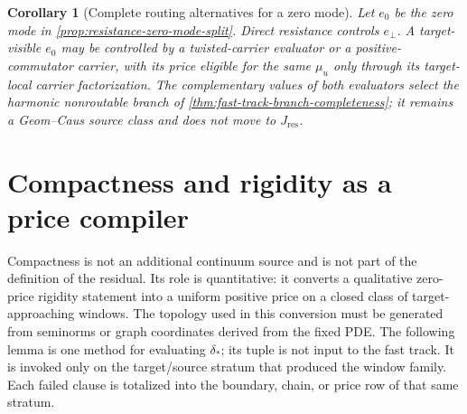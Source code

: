 \documentclass[11pt]{article}
\numberwithin{section}{part}
\theoremstyle{plain}
\newtheorem{corollary}[corollary]{Corollary}
\theoremstyle{definition}
\theoremstyle{remark}
\newcommand{\Res}{J_{\mathrm{res}}}
\begin{document}
\begin{corollary}[Complete routing alternatives for a zero mode]
\label{cor:zero-mode-routing-alternatives}
Let \(e_0\) be the zero mode in
\cref{prop:resistance-zero-mode-split}.  Direct resistance controls
\(e_\perp\).  A target-visible \(e_0\) may be controlled by a
twisted-carrier evaluator or a positive-commutator carrier, with its price
eligible for the same \(\mu_u\) only through its target-local carrier
factorization.  The complementary values of both evaluators select the
harmonic nonroutable branch of
\cref{thm:fast-track-branch-completeness}; it remains a Geom--Caus source
class and does not move to \(\Res\).
\end{corollary}

\section{Compactness and rigidity as a price compiler}
\label{sec:compactness-price}

Compactness is not an additional continuum source and is not part of the
definition of the residual.  Its role is quantitative: it converts a
qualitative zero-price rigidity statement into a uniform positive price on a
closed class of target-approaching windows.  The topology used in this
conversion must be generated from seminorms or graph coordinates derived
from the fixed PDE.  The following lemma is one method for evaluating
\(\delta_*\); its tuple is not input to the fast track.  It is invoked only
on the target/source stratum that produced the window family.  Each failed
clause is totalized into the boundary, chain, or price row of that same
stratum.
\end{document}
